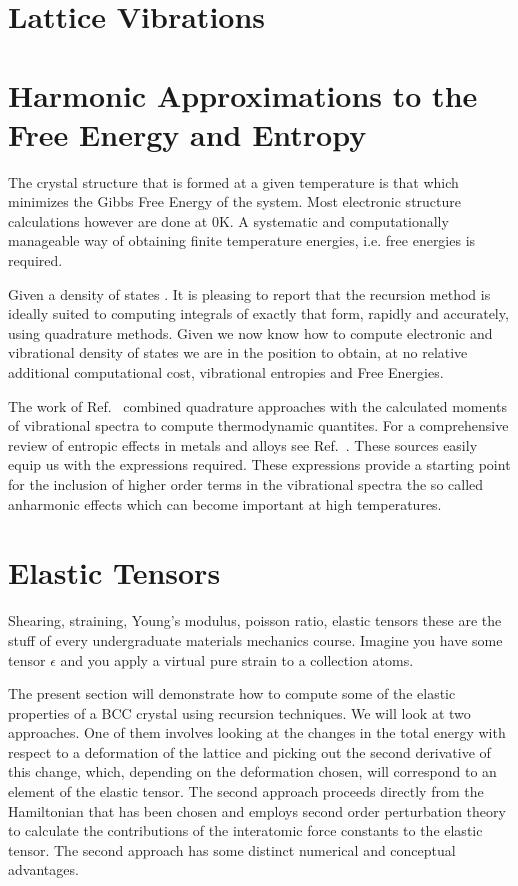 \section{Lattice Vibrations}

\section{Harmonic Approximations to the Free Energy and Entropy}
The crystal structure that is formed at a given temperature is that which
minimizes the Gibbs Free Energy of the system. Most electronic structure calculations
however are done at 0K. A systematic and computationally manageable way of obtaining
finite temperature energies, i.e. free energies is required.

Given a density of states . It is pleasing to report that the recursion method
is ideally suited to computing integrals of exactly that form, rapidly and accurately,
using quadrature methods. Given we now know how to compute electronic and 
vibrational density of states we are in the position to obtain, at no relative additional 
computational cost, vibrational entropies and Free Energies.

The work of Ref.~\cite{wheeler68} combined quadrature approaches
with the calculated moments of vibrational spectra to compute
thermodynamic quantites. For a comprehensive review
of entropic effects in metals and alloys see Ref.~\cite{fultz10}. 
These sources easily equip us with the expressions required. These expressions provide a starting
point for the inclusion of higher order terms in the vibrational spectra
the so called anharmonic effects which can become important at high temperatures.

\section{Elastic Tensors}
Shearing, straining, Young's modulus, poisson ratio, elastic tensors these are the
stuff of every undergraduate materials mechanics course.
Imagine you have some tensor $\epsilon$ and you apply a virtual pure strain to a collection atoms.

The present section will demonstrate how to compute some of the elastic properties
of a BCC crystal using recursion techniques. We will look at two approaches.
One of them involves looking at the changes in the total energy with
respect to a deformation of the lattice and picking out the 
second derivative of this change, which, depending on the deformation chosen,
will correspond to an element of the elastic tensor. The second approach
proceeds directly from the Hamiltonian that has been chosen and employs second order
perturbation theory to calculate the contributions of
the interatomic force constants to the elastic tensor. 
The second approach has some distinct numerical 
and conceptual advantages.

